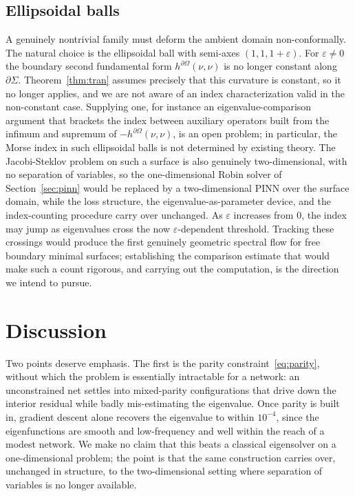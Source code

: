 \documentclass[11pt]{article}
\theoremstyle{definition}
\theoremstyle{plain}
\begin{document}
\subsection{Ellipsoidal balls}

A genuinely nontrivial family must deform the ambient domain non-conformally. The natural choice is the ellipsoidal ball with semi-axes $(1, 1, 1+\varepsilon)$. For $\varepsilon \neq 0$ the boundary second fundamental form $h^{\partial\Omega}(\nu, \nu)$ is no longer constant along $\partial\Sigma$. Theorem~\ref{thm:tran} assumes precisely that this curvature is constant, so it no longer applies, and we are not aware of an index characterization valid in the non-constant case. Supplying one, for instance an eigenvalue-comparison argument that brackets the index between auxiliary operators built from the infimum and supremum of $-h^{\partial\Omega}(\nu, \nu)$, is an open problem; in particular, the Morse index in such ellipsoidal balls is not determined by existing theory. The Jacobi-Steklov problem on such a surface is also genuinely two-dimensional, with no separation of variables, so the one-dimensional Robin solver of Section~\ref{sec:pinn} would be replaced by a two-dimensional PINN over the surface domain, while the loss structure, the eigenvalue-as-parameter device, and the index-counting procedure carry over unchanged. As $\varepsilon$ increases from $0$, the index may jump as eigenvalues cross the now $\varepsilon$-dependent threshold. Tracking these crossings would produce the first genuinely geometric spectral flow for free boundary minimal surfaces; establishing the comparison estimate that would make such a count rigorous, and carrying out the computation, is the direction we intend to pursue.

\section{Discussion}

Two points deserve emphasis. The first is the parity constraint~\eqref{eq:parity}, without which the problem is essentially intractable for a network: an unconstrained net settles into mixed-parity configurations that drive down the interior residual while badly mis-estimating the eigenvalue. Once parity is built in, gradient descent alone recovers the eigenvalue to within $10^{-4}$, since the eigenfunctions are smooth and low-frequency and well within the reach of a modest network. We make no claim that this beats a classical eigensolver on a one-dimensional problem; the point is that the same construction carries over, unchanged in structure, to the two-dimensional setting where separation of variables is no longer available.
\end{document}
